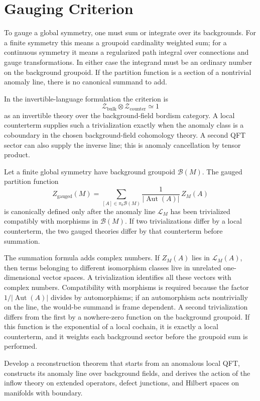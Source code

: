 \section{Gauging Criterion}

To gauge a global symmetry, one must sum or integrate over its backgrounds.
For a finite symmetry this means a groupoid cardinality weighted sum; for a
continuous symmetry it means a regularized path integral over connections and
gauge transformations.  In either case the integrand must be an ordinary
number on the background groupoid.  If the partition function is a section of
a nontrivial anomaly line, there is no canonical summand to add.

In the invertible-language formulation the criterion is
\[
  \mathcal Z_{\mathrm{bulk}}\otimes
  \mathcal Z_{\mathrm{counter}}
  \simeq 1
\]
as an invertible theory over the background-field bordism category.  A local
counterterm supplies such a trivialization exactly when the anomaly class is
a coboundary in the chosen background-field cohomology theory.  A second QFT
sector can also supply the inverse line; this is anomaly cancellation by
tensor product.

\begin{remark}
\label{rem:gauging-requires-trivialized-anomaly-line}
Let a finite global symmetry have background groupoid \(\mathcal B(M)\).
The gauged partition function
\[
  Z_{\mathrm{gauged}}(M)
  =
  \sum_{[A]\in\pi_0\mathcal B(M)}
  \frac{1}{|\operatorname{Aut}(A)|}\,Z_M(A)
\]
is canonically defined only after the anomaly line \(\mathcal L_M\) has been
trivialized compatibly with morphisms in \(\mathcal B(M)\).  If two
trivializations differ by a local counterterm, the two gauged theories differ
by that counterterm before summation.

The summation formula adds complex numbers.  If \(Z_M(A)\) lies in
\(\mathcal L_M(A)\), then terms belonging to different isomorphism classes
live in unrelated one-dimensional vector spaces.  A trivialization identifies
all these vectors with complex numbers.  Compatibility with morphisms is
required because the factor \(1/|\operatorname{Aut}(A)|\) divides by
automorphisms; if an automorphism acts nontrivially on the line, the would-be
summand is frame dependent.  A second trivialization differs from the first
by a nowhere-zero function on the background groupoid.  If this function is
the exponential of a local cochain, it is exactly a local counterterm, and it
weights each background sector before the groupoid sum is performed.
\end{remark}

\begin{openproblem}
\label{op:operator-level-inflow}
Develop a reconstruction theorem that starts from an anomalous local QFT,
constructs its anomaly line over background fields, and derives the action of
the inflow theory on extended operators, defect junctions, and Hilbert spaces
on manifolds with boundary.
\end{openproblem}
